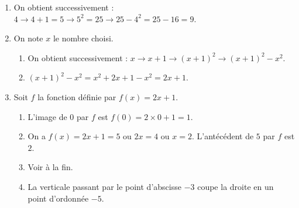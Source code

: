 
\medskip


\medskip

\begin{enumerate}
\item %
On obtient successivement : $4 \to 4 + 1 = 5 \to 5^2 = 25 \to 25 - 4^2 = 25 - 16 = 9$.
\item On note $x$ le nombre choisi.
	\begin{enumerate}
		\item %
On obtient successivement : $x \to x + 1 \to (x + 1)^2 \to (x + 1)^2 - x^2$.
		\item %
$(x + 1)^2 - x^2 = x^2 + 2x + 1 - x^2 = 2x + 1$.
	\end{enumerate}
\item Soit $f$ la fonction définie par $f(x) = 2x + 1$.
	\begin{enumerate}
		\item %
L'image de 0 par $f$ est $f(0) = 2\times 0 + 1 = 1$.
		\item %
On a $f(x) = 2x + 1 = 5$ ou $2x = 4$ ou $x = 2$. L'antécédent de $5$ par $f$ est $2$.
		\item %
Voir à la fin.
		\item %
La verticale passant par le point d'abscisse $- 3$ coupe la droite en un point d'ordonnée $- 5$. 
	\end{enumerate}	
\end{enumerate}
